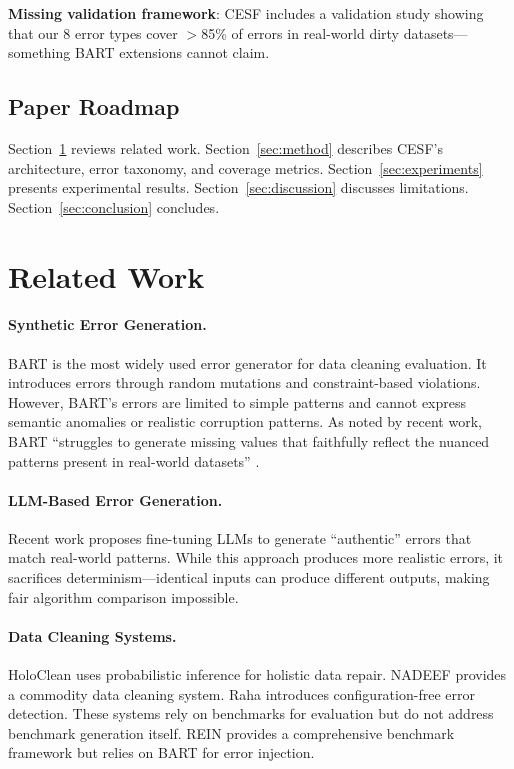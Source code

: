\documentclass[11pt,a4paper]{article}
\begin{document}
\textbf{Missing validation framework}: CESF includes a validation study showing that our 8 error types cover $>$85\% of errors in real-world dirty datasets---something BART extensions cannot claim.

\subsection{Paper Roadmap}

Section~\ref{sec:related} reviews related work. Section~\ref{sec:method} describes CESF's architecture, error taxonomy, and coverage metrics. Section~\ref{sec:experiments} presents experimental results. Section~\ref{sec:discussion} discusses limitations. Section~\ref{sec:conclusion} concludes.

\section{Related Work}
\label{sec:related}

\paragraph{Synthetic Error Generation.}
BART \citep{arocena2015error} is the most widely used error generator for data cleaning evaluation. It introduces errors through random mutations and constraint-based violations. However, BART's errors are limited to simple patterns and cannot express semantic anomalies or realistic corruption patterns. As noted by recent work, BART ``struggles to generate missing values that faithfully reflect the nuanced patterns present in real-world datasets'' \citep{tableeg2025authentic}.

\paragraph{LLM-Based Error Generation.}
Recent work \citep{tableeg2025authentic} proposes fine-tuning LLMs to generate ``authentic'' errors that match real-world patterns. While this approach produces more realistic errors, it sacrifices determinism---identical inputs can produce different outputs, making fair algorithm comparison impossible.

\paragraph{Data Cleaning Systems.}
HoloClean \citep{rekatsinas2017holoclean} uses probabilistic inference for holistic data repair. NADEEF \citep{dallachiesa2013nadeef} provides a commodity data cleaning system. Raha \citep{mahdavi2019raha} introduces configuration-free error detection. These systems rely on benchmarks for evaluation but do not address benchmark generation itself. REIN \citep{abdelaal2023rein} provides a comprehensive benchmark framework but relies on BART for error injection.
\end{document}
